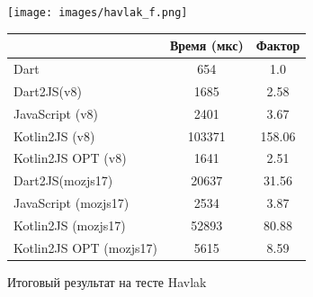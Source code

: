 \begin{figure}[ht!]
\centering
\begin{minipage}[t]{\linewidth}
\texttt{[image: images/havlak\_f.png]}
\end{minipage}

\begin{minipage}[h]{\linewidth}
\centering
\begin{tabular}{|l|c|c|}
    \hline
    ~                       & Время (мкс) & Фактор \\ \hline
    Dart                    & 654        & 1.0    \\ \hline
    Dart2JS(v8)             & 1685       & 2.58   \\ \hline
    JavaScript (v8)         & 2401       & 3.67   \\ \hline
    Kotlin2JS (v8)          & 103371     & 158.06 \\ \hline
    Kotlin2JS OPT (v8)      & 1641       & 2.51   \\ \hline
    Dart2JS(mozjs17)        & 20637      & 31.56  \\ \hline
    JavaScript (mozjs17)    & 2534       & 3.87   \\ \hline
    Kotlin2JS (mozjs17)     & 52893      & 80.88  \\ \hline
    Kotlin2JS OPT (mozjs17) & 5615       & 8.59   \\ \hline
\end{tabular}
\end{minipage}
\caption{Итоговый результат на тесте Havlak}
\label{havlak_f}
\end{figure}

